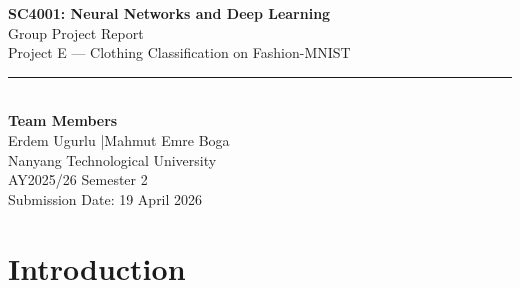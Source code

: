 \documentclass[10pt,a4paper]{article}
\begin{document}
\thispagestyle{empty}
\begin{center}
  {\LARGE \textbf{SC4001: Neural Networks and Deep Learning}}\\[0.4cm]
  {\Large Group Project Report}\\[0.3cm]
  {\large Project E — Clothing Classification on Fashion-MNIST}\\[0.8cm]
  \rule{12cm}{0.5pt}\\[0.6cm]
  {\large \textbf{Team Members}}\\[0.3cm]
  {\large Erdem Ugurlu \quad|\quad Mahmut Emre Boga}\\[0.8cm]
  {\large Nanyang Technological University}\\[0.2cm]
  {\large AY2025/26 Semester 2}\\[0.2cm]
  {\large Submission Date: 19 April 2026}\\[1.5cm]
\end{center}

\begin{abstract}
We investigate deep learning architectures for clothing classification on the Fashion-MNIST dataset.
Starting from a standard CNN baseline, we introduce two novel improvements: (1) \textbf{dilated convolutions} (dilation rate $d$) in deeper layers to expand the effective receptive field without reducing spatial resolution, and (2) \textbf{Squeeze-and-Excitation (SE) channel attention} integrated into the dilated CNN.
We additionally compare a lightweight Vision Transformer (ViT) and evaluate three data augmentation strategies: MixUp, CutMix, and label smoothing.
Across 15 experiments and a dedicated ablation study on dilation rate ($d \in \{1,2,3\}$), our best model — SE-DilatedCNN without augmentation — achieves \textbf{92.82\% test accuracy} and a macro-F1 of \textbf{0.9280}, outperforming all baselines.
Grad-CAM visualisations confirm that the model correctly attends to discriminative garment regions.
\end{abstract}

\newpage
\tableofcontents
\newpage

\section{Introduction}
\end{document}
